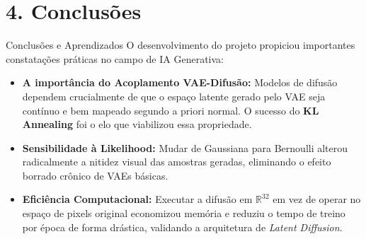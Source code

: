 \documentclass[10pt,aspectratio=169]{beamer}
\begin{document}
\section{4. Conclusões}
\begin{frame}{Conclusões e Aprendizados}
    O desenvolvimento do projeto propiciou importantes constatações práticas no campo de IA Generativa:
    \vspace{0.2cm}
    \begin{itemize}
        \item \textbf{A importância do Acoplamento VAE-Difusão:} Modelos de difusão dependem crucialmente de que o espaço latente gerado pelo VAE seja contínuo e bem mapeado segundo a priori normal. O sucesso do \textbf{KL Annealing} foi o elo que viabilizou essa propriedade.
        \item \textbf{Sensibilidade à Likelihood:} Mudar de Gaussiana para Bernoulli alterou radicalmente a nitidez visual das amostras geradas, eliminando o efeito borrado crônico de VAEs básicas.
        \item \textbf{Eficiência Computacional:} Executar a difusão em $\mathbb{R}^{32}$ em vez de operar no espaço de pixels original economizou memória e reduziu o tempo de treino por época de forma drástica, validando a arquitetura de \textit{Latent Diffusion}.
    \end{itemize}
\end{frame}
\end{document}

